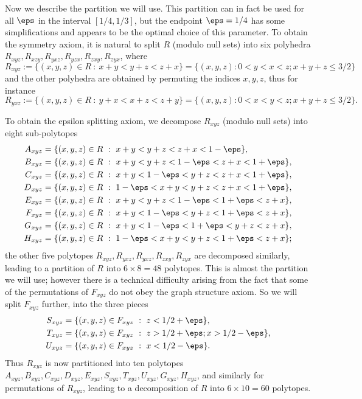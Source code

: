 Now we describe the partition we will use.  This partition can in fact be used for all $\eps$ in the interval $[1/4,1/3]$, but the endpoint $\eps = 1/4$ has some simplifications and appears to be the optimal choice of this parameter.  To obtain the symmetry axiom, it is natural to split $R$ (modulo null sets) into six polyhedra $R_{xyz}, R_{xzy}, R_{yxz}, R_{yzx}, R_{zxy}, R_{zyx}$, where
$$ R_{xyz} := \{(x,y,z)\in R\ :\ x+y < y+z < z+x\} = \{(x,y,z): 0 < y < x < z; x+y+z \leq 3/2 \}$$
and the other polyhedra are obtained by permuting the indices $x,y,z$, thus for instance
$$ R_{yxz} := \{(x,y,z)\in R\ :\ y+x < x+z < z+y\} = \{(x,y,z): 0 < x < y < z; x+y+z \leq 3/2 \}.$$

To obtain the epsilon splitting axiom, we decompose $R_{xyz}$ (modulo null sets) into eight sub-polytopes
\begin{align*}
A_{xyz} & =\{(x,y,z)\in R\ :\ x+y< y+z< z+x< 1-\eps\},\\
B_{xyz} & =\{(x,y,z)\in R\ :\ x+y< y+z< 1-\eps< z+x< 1+\eps\},\\
C_{xyz} & =\{(x,y,z)\in R\ :\ x+y< 1-\eps < y+z < z+x< 1+\eps\},\\
D_{xyz} & =\{(x,y,z)\in R\ :\ 1-\eps < x+y<  y+z < z+x< 1+\eps\},\\
E_{xyz} & =\{(x,y,z)\in R\ :\ x+y< y+z< 1-\eps <  1+\eps < z+x\},\\
F_{xyz} & =\{(x,y,z)\in R\ :\ x+y< 1-\eps < y+z <  1+\eps < z+x\},\\
G_{xyz} & =\{(x,y,z)\in R\ :\ x+y< 1-\eps  <  1+\eps < y+z < z+x\},\\
H_{xyz} & =\{(x,y,z)\in R\ :\ 1-\eps < x+y<  y+z < 1+\eps < z+x\};
\end{align*}
the other five polytopes $R_{xyz}, R_{yxz}, R_{yxz}, R_{zxy}, R_{zyx}$ are decomposed similarly, leading to a partition of $R$ into $6 \times 8 = 48$ polytopes.
This is almost the partition we will use; however there is a technical difficulty arising from the fact that some of the permutations of $F_{xyz}$ do not obey the graph structure axiom.  So we will split $F_{xyz}$ further, into the three pieces
\begin{align*}
S_{xyz} & = \{(x,y,z)\in F_{xyz}\ :\ z< 1/2+\eps\},\\
T_{xyz} & = \{(x,y,z)\in F_{xyz}\ :\ z> 1/2+\eps;x> 1/2-\eps \}, \\
U_{xyz} & = \{(x,y,z)\in F_{xyz}\ :\ x< 1/2-\eps \}.
\end{align*}
Thus $R_{xyz}$ is now partitioned into ten polytopes $A_{xyz}, B_{xyz}, C_{xyz}, D_{xyz}, E_{xyz}, S_{xyz}, T_{xyz}, U_{xyz}, G_{xyz}, H_{xyz}$, and similarly for permutations of $R_{xyz}$, leading to a decomposition of $R$ into $6 \times 10 = 60$ polytopes.

